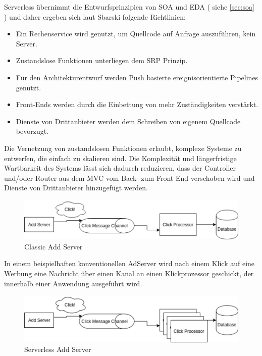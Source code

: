 \documentclass[
12pt,
english,
ngerman,
headsepline,
twoside,
openright,
numbers=noenddot,version=first
]{scrreprt}
\begin{document}
Serverless übernimmt die Entwurfsprinzipien von \acrshort{SOA} und \acrshort{EDA} ( siehe \autoref{sec:soa} ) und daher ergeben sich laut Sbarski folgende Richtlinien:
\begin{itemize}\label{par:serverless-principles}
	\item Ein Rechenservice wird genutzt, um Quellcode auf Anfrage auszuführen, kein Server.
	\item Zustandslose Funktionen unterliegen dem \acrshort{SRP} Prinzip.
	\item Für den Architekturentwurf werden Push basierte ereignisorientierte Pipelines genutzt.
	\item Front-Ends werden durch die Einbettung von mehr Zuständigkeiten verstärkt.
	\item Dienste von Drittanbieter werden dem Schreiben von eigenem Quellcode bevorzugt.
\end{itemize}\cite{serverlessArchAWS}

Die Vernetzung von zustandslosen Funktionen erlaubt, komplexe Systeme zu entwerfen, die einfach zu skalieren sind.
Die Komplexität und längerfristige Wartbarkeit des Systems lässt sich dadurch reduzieren, dass der Controller und/oder Router aus dem \acrfull{MVC} \cite{fowlerBlogMVC} vom Back- zum Front-End verschoben wird und Dienste von Drittanbieter hinzugefügt werden. \cite{patternAWS}

\begin{figure}[H]
	\centering
	\includegraphics[scale=0.60]{./pics/classic-example.eps}
	\caption{Classic Add Server}
	\label{pic:classic-add}
\end{figure}


In einem beispielhaften konventionellen AdServer wird nach einem Klick auf eine Werbung eine Nachricht über einen Kanal an einen Klickprozessor geschickt, der innerhalb einer Anwendung ausgeführt wird.
\begin{figure}[H]
	\centering
	\includegraphics[scale=0.60]{./pics/serverless-example.eps}
	\caption{Serverless Add Server}
	\label{pic:serverless-add}
\end{figure}
\end{document}
